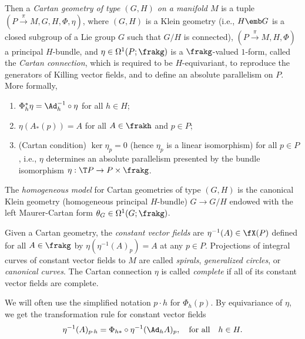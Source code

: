 \begin{defn}\label{def cartan geometry I}
    Then a \emph{Cartan geometry of type $(G,H)$ on a manifold $M$} is a tuple $(P\overset{\pi}{\to}M,G,H,\Phi,\eta)$, where $(G,H)$ is a Klein geometry (i.e., $H\emb G$ is a closed subgroup of a Lie group $G$ such that $G\slash H$ is connected),
    $(P\overset{\pi}{\to}M,H,\Phi)$ a principal $H$-bundle, and $\eta\in\Omega^1(P;\frakg)$ is a $\frakg$-valued $1$-form, called the \emph{Cartan connection}, which is required to be $H$-equivariant, to reproduce the generators of Killing vector fields, and to define an absolute parallelism on $P$. More formally,
    \begin{enumerate}
        \item $\Phi_h^\ast \eta=\Ad_h^{-1}\circ \eta$ for all $h\in H$;
        \item $\eta(A_\ast(p))=A$ for all $A\in\frakh$ and $p\in P$;
        \item (Cartan condition) $\ker\eta_p=0$ (hence $\eta_p$ is a linear isomorphism) for all $p\in P$, i.e., $\eta$ determines an absolute parallelism presented by the bundle isomorphism $\eta:\T P\to P\times\frakg$.
    \end{enumerate}
    The \emph{homogeneous model} for Cartan geometries of type $(G,H)$ is the canonical Klein geometry (homogeneous principal $H$-bundle) $G\to G\slash H$ endowed with the left Maurer-Cartan form $\theta_G\in\Omega^1(G;\frakg)$.

    Given a Cartan geometry, the \emph{constant vector fields} are $\eta^{-1}(A)\in\fX(P)$ defined for all $A\in\frakg$ by $\eta(\eta^{-1}(A)_p)=A$ at any $p\in P$. Projections of integral curves of constant vector fields to $M$ are called \emph{spirals}, \emph{generalized circles}, or \emph{canonical curves}. The Cartan connection $\eta$ is called \emph{complete} if all of its constant vector fields are complete.
\end{defn}

We will often use the simplified notation $p\cdot h$ for $\Phi_h(p)$. By equivariance of $\eta$, we get the transformation rule for constant vector fields
\[\eta^{-1}(A)_{p\cdot h}=\Phi_{h\ast}\circ \eta^{-1}(\Ad_h A)_p,\quad \text{for all}\quad h\in H.\]



